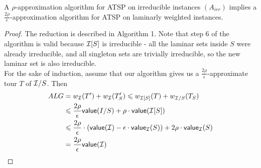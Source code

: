 \documentclass[./main.tex]{subfiles}
\begin{document}
	\begin{theorem}
		A $\rho$-approximation algorithm for ATSP on irreducible instances $(A_{irr})$ implies a $\frac{2\rho}{\epsilon}$-approximation algorithm for ATSP on laminarly weighted instances.
	\end{theorem}
	\begin{proof}
		The reduction is described in Algorithm 1. Note that step 6 of the algorithm is valid because $\mathcal{I}[S]$ is irreducible - all the laminar sets inside $S$ were already irreducible, and all singleton sets are trivially irreducible, so the new laminar set is also irreducible.\\
		For the sake of induction, assume that our algorithm gives us a $\frac{2\rho}{\epsilon}$-approximate tour $T$ of $\mathcal{I}/S$. Then
		\begin{align*}
				ALG &= w_{\mathcal{I}}(T') + w_{\mathcal{I}}(T_S') \leqslant w_{\mathcal{I}[S]}(T) + w_{\mathcal{I}/S}(T_S) \\&\leqslant \frac{2\rho}{\epsilon}\textsf{\textup{value}}(I/S) + \rho\cdot \textsf{\textup{value}}(\mathcal{I}[S])\\
				&\leqslant \frac{2\rho}{\epsilon}\cdot(\textsf{\textup{value}}(\mathcal{I}) - \epsilon\cdot\textsf{\textup{value}}_{\mathcal{I}}(S)) + 2\rho\cdot\textsf{\textup{value}}_{\mathcal{I}}(S)\\
				&= \frac{2\rho}{\epsilon} \textsf{\textup{value}}(\mathcal{I})
		\end{align*}
	\end{proof}
\end{document}
